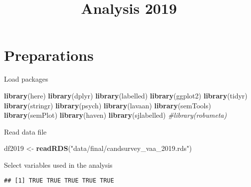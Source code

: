 \documentclass[
]{article}
\title{Analysis 2019}
\author{}
\date{\vspace{-2.5em}}
\newenvironment{Shaded}{\begin{snugshade}}{\end{snugshade}}
\newcommand{\CommentTok}[1]{\textcolor[rgb]{0.56,0.35,0.01}{\textit{#1}}}
\newcommand{\KeywordTok}[1]{\textcolor[rgb]{0.13,0.29,0.53}{\textbf{#1}}}
\newcommand{\NormalTok}[1]{#1}
\newcommand{\OperatorTok}[1]{\textcolor[rgb]{0.81,0.36,0.00}{\textbf{#1}}}
\newcommand{\StringTok}[1]{\textcolor[rgb]{0.31,0.60,0.02}{#1}}
\begin{document}
\maketitle

{
\setcounter{tocdepth}{5}
\tableofcontents
}
\newpage

\hypertarget{preparations}{%
\section{Preparations}\label{preparations}}

Load packages

\begin{Shaded}
\begin{Highlighting}[]
\KeywordTok{library}\NormalTok{(here)}
\KeywordTok{library}\NormalTok{(dplyr)}
\KeywordTok{library}\NormalTok{(labelled)}
\KeywordTok{library}\NormalTok{(ggplot2)}
\KeywordTok{library}\NormalTok{(tidyr)}
\KeywordTok{library}\NormalTok{(stringr)}
\KeywordTok{library}\NormalTok{(psych)}
\KeywordTok{library}\NormalTok{(lavaan)}
\KeywordTok{library}\NormalTok{(semTools)}
\KeywordTok{library}\NormalTok{(semPlot)}
\KeywordTok{library}\NormalTok{(haven)}
\KeywordTok{library}\NormalTok{(sjlabelled)}
\CommentTok{#library(robumeta)}
\end{Highlighting}
\end{Shaded}

Read data file

\begin{Shaded}
\begin{Highlighting}[]
\NormalTok{df2019 <-}\StringTok{ }\KeywordTok{readRDS}\NormalTok{(}\StringTok{"data/final/candsurvey_vaa_2019.rds"}\NormalTok{)}
\end{Highlighting}
\end{Shaded}

Select variables used in the analysis

\begin{Shaded}
\end{Shaded}

\begin{verbatim}
## [1] TRUE TRUE TRUE TRUE TRUE
\end{verbatim}
\end{document}
